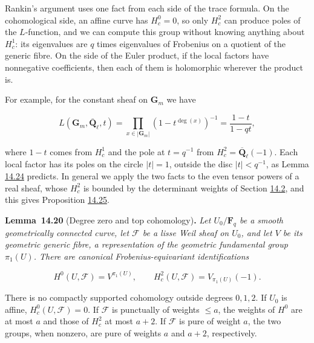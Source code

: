 \documentclass[11pt]{article}
\newenvironment{bpstatement}[2]{\par\addvspace{0.6\baselineskip}\noindent\textbf{#1}#2\textbf{.}\enspace\ignorespaces}
  {\par\addvspace{0.4\baselineskip}}
\newenvironment{bpstatementit}[2]{\begin{bpstatement}{#1}{#2}\itshape\ignorespaces}{\end{bpstatement}}
\begin{document}
Rankin's argument uses one fact from each side of the trace formula. On the cohomological side, an affine curve has \(H^0_c=0\), so only \(H^2_c\) can produce poles of the \(L\)-function, and we can compute this group without knowing anything about \(H^1_c\): its eigenvalues are \(q\) times eigenvalues of Frobenius on a quotient of the generic fibre. On the side of the Euler product, if the local factors have nonnegative coefficients, then each of them is holomorphic wherever the product is.

For example, for the constant sheaf on \(\mathbf G_m\) we have

\[
L(\mathbf G_m,\overline{\mathbf Q}_\ell,t)=\prod_{x\in|\mathbf G_m|}(1-t^{\deg(x)})^{-1}
=\frac{1-t}{1-qt},
\]

where \(1-t\) comes from \(H^1_c\) and the pole at \(t=q^{-1}\) from \(H^2_c=\overline{\mathbf Q}_\ell(-1)\). Each local factor has its poles on the circle \(|t|=1\), outside the disc \(|t|<q^{-1}\), as Lemma \hyperref[bp75]{14.24} predicts. In general we apply the two facts to the even tensor powers of a real sheaf, whose \(H^2_c\) is bounded by the determinant weights of Section \hyperref[bp31]{14.2}, and this gives Proposition \hyperref[bp78]{14.25}.

\label{bp66}%
\begin{bpstatementit}{Lemma~14.20}{ (Degree zero and top cohomology)}
Let \(U_0/\mathbf F_q\) be a smooth geometrically connected curve, let \(\mathcal F\) be a lisse Weil sheaf on \(U_0\), and let \(V\) be its geometric generic fibre, a representation of the geometric fundamental group \(\pi_1(U)\).  There are canonical Frobenius-equivariant identifications

\[
H^0(U,\mathcal F)=V^{\pi_1(U)},\qquad
H_c^2(U,\mathcal F)=V_{\pi_1(U)}(-1).
\]

There is no compactly supported cohomology outside degrees \(0,1,2\). If \(U_0\) is affine, \(H_c^0(U,\mathcal F)=0\). If \(\mathcal F\) is punctually of weights \(\le a\), the weights of \(H^0\) are at most \(a\) and those of \(H_c^2\) at most \(a+2\).  If \(\mathcal F\) is pure of weight \(a\), the two groups, when nonzero, are pure of weights \(a\) and \(a+2\), respectively.
\end{bpstatementit}
\end{document}
